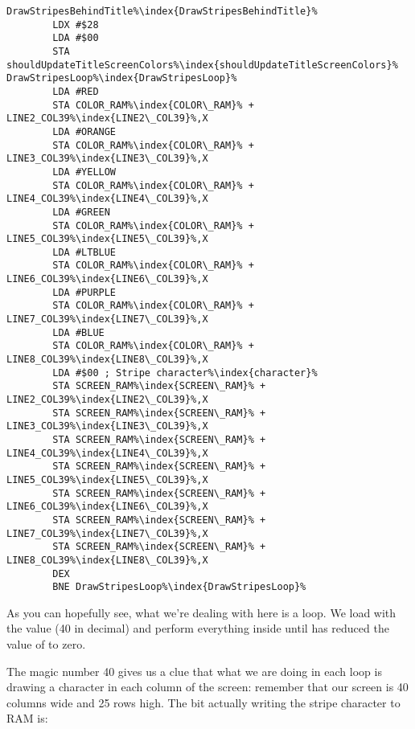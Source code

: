 \begin{lstlisting}[caption=Drawing stripes using a loop!,escapechar=\%]
DrawStripesBehindTitle%\index{DrawStripesBehindTitle}%
        LDX #$28
        LDA #$00
        STA shouldUpdateTitleScreenColors%\index{shouldUpdateTitleScreenColors}%
DrawStripesLoop%\index{DrawStripesLoop}%   
        LDA #RED
        STA COLOR_RAM%\index{COLOR\_RAM}% + LINE2_COL39%\index{LINE2\_COL39}%,X
        LDA #ORANGE
        STA COLOR_RAM%\index{COLOR\_RAM}% + LINE3_COL39%\index{LINE3\_COL39}%,X
        LDA #YELLOW
        STA COLOR_RAM%\index{COLOR\_RAM}% + LINE4_COL39%\index{LINE4\_COL39}%,X
        LDA #GREEN
        STA COLOR_RAM%\index{COLOR\_RAM}% + LINE5_COL39%\index{LINE5\_COL39}%,X
        LDA #LTBLUE
        STA COLOR_RAM%\index{COLOR\_RAM}% + LINE6_COL39%\index{LINE6\_COL39}%,X
        LDA #PURPLE
        STA COLOR_RAM%\index{COLOR\_RAM}% + LINE7_COL39%\index{LINE7\_COL39}%,X
        LDA #BLUE
        STA COLOR_RAM%\index{COLOR\_RAM}% + LINE8_COL39%\index{LINE8\_COL39}%,X
        LDA #$00 ; Stripe character%\index{character}%
        STA SCREEN_RAM%\index{SCREEN\_RAM}% + LINE2_COL39%\index{LINE2\_COL39}%,X
        STA SCREEN_RAM%\index{SCREEN\_RAM}% + LINE3_COL39%\index{LINE3\_COL39}%,X
        STA SCREEN_RAM%\index{SCREEN\_RAM}% + LINE4_COL39%\index{LINE4\_COL39}%,X
        STA SCREEN_RAM%\index{SCREEN\_RAM}% + LINE5_COL39%\index{LINE5\_COL39}%,X
        STA SCREEN_RAM%\index{SCREEN\_RAM}% + LINE6_COL39%\index{LINE6\_COL39}%,X
        STA SCREEN_RAM%\index{SCREEN\_RAM}% + LINE7_COL39%\index{LINE7\_COL39}%,X
        STA SCREEN_RAM%\index{SCREEN\_RAM}% + LINE8_COL39%\index{LINE8\_COL39}%,X
        DEX
        BNE DrawStripesLoop%\index{DrawStripesLoop}%

\end{lstlisting}

As you can hopefully see, what we're dealing with here is a loop. We load  with the value  (40 in decimal)
and perform everything inside  until  has reduced the value of  to zero.

The magic number 40 gives us a clue that what we are doing in each loop is drawing a character in each column of the screen:
remember that our screen is 40 columns wide and 25 rows high. The bit actually writing the stripe character to RAM is:


